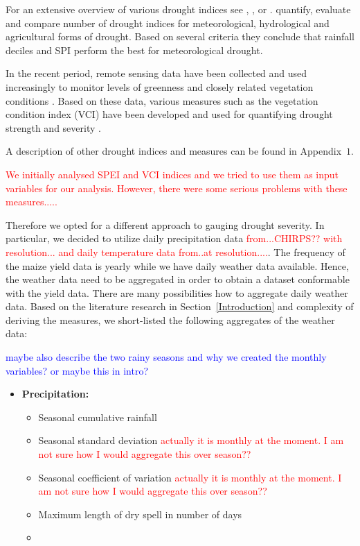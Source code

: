 \documentclass[a4paper,12pt]{article}
\begin{document}
For an extensive overview of various drought indices see \cite{Heim2002}, \cite{monacelli2005}, \cite{zargar2011} or \cite{svoboda2016}. \cite{keyantash2002} quantify, evaluate and compare number of drought indices for meteorological, hydrological and agricultural forms of drought. Based on several criteria they conclude that rainfall deciles and SPI perform the best for meteorological drought.

In the recent period, remote sensing data have been collected and used increasingly to monitor levels of greenness and closely related vegetation conditions \citep{nicolai2017}. Based on these data, various measures such as the vegetation condition index (VCI) have been developed and used for quantifying drought strength and severity \citep{KlischAtz2016}.

A description of other drought indices and measures can be found in Appendix~$1$.

\textcolor{red}{We initially analysed SPEI and VCI indices and we tried to use them as input variables for our analysis. However, there were some serious problems with these measures.....}

Therefore we opted for a different approach to gauging drought severity. In particular, we decided to utilize daily precipitation data \textcolor{red}{from...CHIRPS?? with resolution... and daily temperature data from..at resolution....}. The frequency  of the maize yield data is yearly while we have daily weather data available. Hence, the weather data need to be aggregated in order to obtain a dataset conformable with the yield data. There are many possibilities how to aggregate daily weather data. Based on the literature research in Section~\ref{Introduction} and complexity of deriving the measures, we short-listed the following aggregates of the weather data:


\textcolor{blue}{maybe also describe the two rainy seasons and why we created the monthly variables? or maybe this in intro?}
\begin{itemize}

\item \textbf{Precipitation:}

\begin{itemize}
\item Seasonal cumulative rainfall
\item Seasonal standard deviation \textcolor{red}{actually it is monthly at the moment. I am not sure how I would aggregate this over season??}
\item Seasonal coefficient of variation \textcolor{red}{actually it is monthly at the moment. I am not sure how I would aggregate this over season??}
\item Maximum length of dry spell in number of days
\item 
\end{itemize}
\end{itemize}
\end{document}
